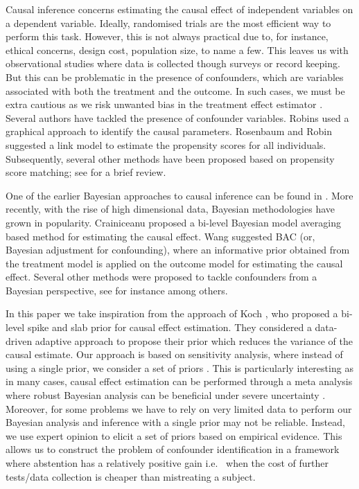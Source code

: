 \documentclass{amsart}
\begin{document}
Causal inference concerns estimating the causal
effect of independent variables on a dependent variable. Ideally,
randomised trials are the most efficient way to perform this task.
However, this is not always practical due to, for instance, ethical 
concerns, design cost, population size, to name a few. This
leaves us with observational studies
where data is collected though surveys or record keeping. But this
can be problematic in the presence of confounders, which are variables associated with both the treatment and the outcome.
In such cases, we must be extra cautious as we risk
unwanted bias in the treatment effect estimator \cite{rosenbaum83}.
Several authors have tackled the presence of
confounder variables. 
Robins \cite{Robins1986ANA} used a graphical
approach to identify the causal parameters.
Rosenbaum and Robin \cite{rosenbaum1985} suggested a link model to estimate
the propensity scores for all individuals. Subsequently, several other
methods have been proposed based on propensity score matching;
see \cite{winship99,stuart10} for a brief review.

One of the earlier Bayesian approaches to causal inference
can be found in \cite{rubin1978}. More recently,
with the rise of high dimensional data,
Bayesian methodologies have grown in popularity.
Crainiceanu \cite{Crainiceanu2008} proposed a bi-level 
Bayesian model averaging based method for estimating the causal 
effect. Wang \cite{wang2015} suggested BAC (or, Bayesian adjustment for
confounding),
where an informative prior obtained from
the treatment model is applied on the outcome model for
estimating the causal effect. Several other methods were
proposed to tackle confounders from a Bayesian perspective,
see for instance \cite{Zigler2014,Hahn2018} among others.

In this paper we take inspiration from the approach of Koch \cite{koch2020}, who proposed a bi-level spike and slab prior for causal effect 
estimation. They considered a data-driven adaptive approach to
propose their prior which reduces the variance of the causal estimate. 
Our approach is based on
sensitivity analysis, where instead of using a single prior, 
we consider a set of priors \cite{BERGER1990303}. This is particularly 
interesting as in many cases, causal effect estimation can be performed 
through a meta analysis where robust Bayesian analysis 
can be beneficial under severe uncertainty \cite{raices_cruz22}.
Moreover, for some problems 
we have to rely on very limited data to perform our Bayesian analysis and 
inference with a single prior may not be reliable.
Instead, we use expert opinion to elicit a set of priors 
based on empirical evidence. 
This allows us to construct the problem of confounder identification 
in a framework where abstention has a relatively positive gain i.e.~
when the cost of further tests/data collection is cheaper than
mistreating a subject.
\end{document}
